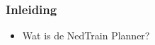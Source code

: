 \begin{frame}\frametitle{Inleiding}
\begin{itemize}
    \item Wat is de NedTrain Planner?
\end{itemize}
\end{frame}
